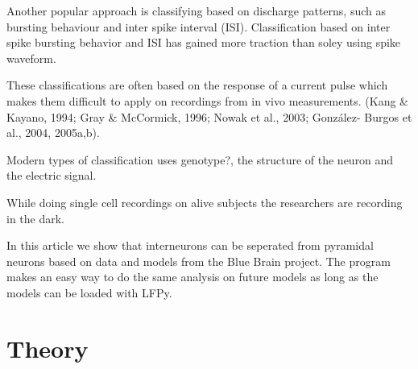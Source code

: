\documentclass[altfont, fleqn]{uiophd}
\begin{document}
Another popular approach is classifying based on discharge patterns, 
such as bursting behaviour and inter spike interval (ISI).
Classification based on inter spike bursting behavior and ISI has
gained more traction than soley using spike waveform. 

These classifications are often based
on the response of a current pulse which makes them difficult
to apply on recordings from
in vivo measurements. 
(Kang \& Kayano,
1994; Gray \& McCormick, 1996; Nowak et al., 2003; González-
Burgos et al., 2004, 2005a,b).

Modern types of 
classification uses genotype?, the structure of the neuron and the 
electric signal.

While doing single cell recordings on alive subjects the researchers are
recording in the dark. 

In this article we show that interneurons can be seperated from pyramidal
neurons based on data and models from the Blue Brain project. 
The program makes an easy way to do the same analysis
on future models as long as the models can be loaded with LFPy.


\chapter{Theory}

\vspace{1em} 
\startcontents
{}
  
\end{document}
